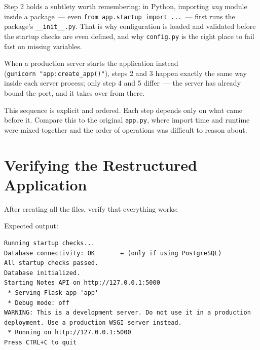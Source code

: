 \noindent{}Step 2 holds a subtlety worth remembering: in Python, importing \emph{any} module inside a package~--- even \texttt{from\ app.}\allowbreak{}\texttt{startup\ import\ .}\allowbreak{}\texttt{.}\allowbreak{}\texttt{.}~--- first runs the package's \texttt{\_\_init\_\_.py}. That is why configuration is loaded and validated before the startup checks are even defined, and why \texttt{config.py} is the right place to fail fast on missing variables.

When a production server starts the application instead (\texttt{gunicorn\ "app:}\allowbreak{}\texttt{create\_}\allowbreak{}\texttt{app()"}), steps 2 and 3 happen exactly the same way inside each server process; only step 4 and 5 differ~--- the server has already bound the port, and it takes over from there.

This sequence is explicit and ordered. Each step depends only on what came before it. Compare this to the original \texttt{app.py}, where import time and runtime were mixed together and the order of operations was difficult to reason about.

\setcounter{section}{8}
\section{Verifying the Restructured Application}\label{15-structuring-the-application:159-verifying-the-restructured-application}

After creating all the files, verify that everything works:

\begin{codebox}[short]

\begin{Shaded}
\begin{Highlighting}[]

\end{Highlighting}
\end{Shaded}

\end{codebox}

\noindent{}Expected output:

\begin{outputbox}[short]
\begin{Verbatim}[fontsize=\codesize, breaklines, breakanywhere, breaksymbolleft={\tiny\textcolor{muted}{$\hookrightarrow$}}]
Running startup checks...
Database connectivity: OK       ← (only if using PostgreSQL)
All startup checks passed.
Database initialized.
Starting Notes API on http://127.0.0.1:5000
 * Serving Flask app 'app'
 * Debug mode: off
WARNING: This is a development server. Do not use it in a production deployment. Use a production WSGI server instead.
 * Running on http://127.0.0.1:5000
Press CTRL+C to quit
\end{Verbatim}
\end{outputbox}

